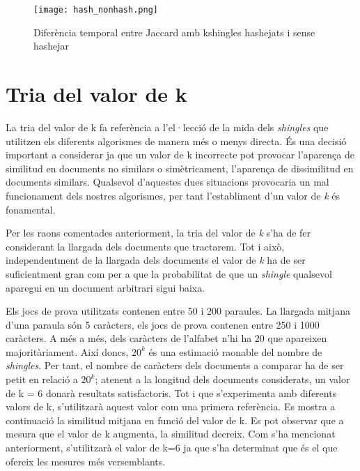 \documentclass[catalan, 12pt]{report}
\begin{document}
\begin{figure}[!h]
  \centering
  \texttt{[image: hash\_nonhash.png]}
  \centering
  \caption[Caption for LOF]{Diferència temporal entre Jaccard amb kshingles hashejats i sense hashejar\protect}
\end{figure}


\section{Tria del valor de k}

La tria del valor de k fa referència a l'el·lecció de la mida dels \textit{shingles} que utilitzen els diferents algorismes de manera més o menys directa. És una decisió important a considerar ja que un valor de k incorrecte pot provocar l'aparença de similitud en documents no similars o simètricament, l'aparença de dissimilitud en documents similars. Qualsevol d'aquestes dues situacions provocaria un mal funcionament dels nostres algorismes, per tant l'establiment d'un valor de \textit{k} és fonamental. \newline

Per les raons comentades anteriorment, la tria del valor de \textit{k} s'ha de fer considerant la llargada dels documents que tractarem. Tot i això, independentment de la llargada dels documents el valor de \textit{k} ha de ser suficientment gran com per a que la probabilitat de que un \textit{shingle} qualsevol aparegui en un document arbitrari sigui baixa. \newline

Els jocs de prova utilitzats contenen entre 50 i 200 paraules. La llargada mitjana d'una paraula són 5 caràcters, els jocs de prova contenen entre 250 i 1000 caràcters. A més a més, dels caràcters de l'alfabet n'hi ha 20 que apareixen majoritàriament. Així doncs, \(  20^k \) és una estimació raonable del nombre de \textit{shingles}. Per tant, el nombre de caràcters dels documents a comparar ha de ser petit en relació a \(  20^k \); atenent a la longitud dels documents considerats, un valor de k = 6 donarà resultats satisfactoris. Tot i que s'experimenta amb diferents valors de k, s'utilitzarà aquest valor com una primera referència. Es mostra a continuació la similitud mitjana en funció del valor de k. Es pot observar que a mesura que el valor de k augmenta, la similitud decreix. Com s'ha mencionat anteriorment, s'utilitzarà el valor de k=6 ja que s'ha determinat que és el que ofereix les mesures més versemblants. \newline
\end{document}
